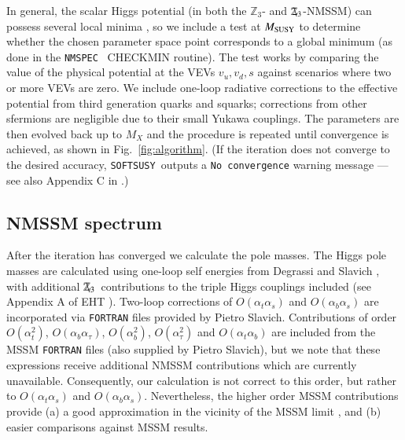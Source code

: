 \documentclass[final,3p,times]{elsarticle}
\def\SOFTSUSY{{\tt SOFTSUSY}}
\newcommand{\Zv}{\,\mathbf{\backslash}\mkern-11.0mu{\mathbb{Z}}_{3}} %
\def\at{\alpha_t}
\def\ab{\alpha_b}
\def\as{\alpha_s}
\def\atau{\alpha_{\tau}}
\def\oatab{O(\at\ab)}
\def\oatas{O(\at\as)}
\def\oabas{O(\ab\as)}
\def\oatq{O(\at^2)}
\def\oabq{O(\ab^2)}
\def\oatauq{O(\atau^2)}
\def\oabatau{O(\ab \atau)}
\begin{document}
In general, the scalar Higgs potential (in both the $\mathbb{Z}_3$- and 
$\Zv$-NMSSM) can possess several local minima \cite{Ellwanger:2009dp}, so we 
include a test at $M_{\rm SUSY}$ to determine whether the chosen parameter space 
point corresponds to a global minimum (as done in the {\tt NMSPEC}~\cite{Ellwanger:2006rn} 
CHECKMIN routine).  The test works by comparing the value of the physical potential at 
the VEVs $v_u,v_d,s$ against scenarios where two or more VEVs are zero.  We 
include one-loop radiative corrections to the effective potential from third 
generation quarks and squarks; corrections from other sfermions are negligible 
due to their small Yukawa couplings. The parameters are then evolved back up to $M_X$ and 
the procedure is repeated until convergence is achieved, as shown in Fig.~\ref{fig:algorithm}. 
(If the iteration does not converge to the desired accuracy, \SOFTSUSY~outputs a 
{\tt No convergence} warning message --- see also Appendix C in \cite{Allanach:2001kg}.)

\subsection{NMSSM spectrum \label{spec}}
After the iteration has converged we calculate the pole masses.  The
Higgs pole masses are calculated using one-loop self energies from Degrassi and 
Slavich \cite{Degrassi:2009yq}, with additional $\Zv$~contributions to the 
triple Higgs couplings included (see Appendix A of EHT \cite{Ellwanger:2009dp}).
Two-loop corrections \cite{Degrassi:2009yq} of $\oatas$ and $\oabas$ are 
incorporated via {\tt FORTRAN} files provided by Pietro Slavich.  Contributions 
of order $\oatq$, $\oabatau$, $\oabq$, $\oatauq$ and $\oatab$ are included from 
the MSSM {\tt FORTRAN} files (also supplied by Pietro Slavich), but we note that
 these expressions receive additional NMSSM contributions which are currently 
unavailable.  Consequently, our calculation is not correct to this order, but 
rather to $\oatas$ and $\oabas$.  Nevertheless, the higher order MSSM 
contributions provide (a) a good approximation in the vicinity of the MSSM limit
, and (b) easier comparisons against MSSM results.
\end{document}
